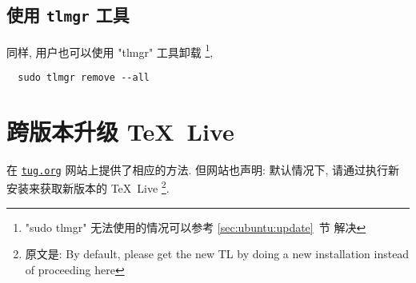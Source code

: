 \subsection{使用 \texttt{tlmgr} 工具}

同样,
用户也可以使用 "tlmgr" 工具卸载%
\footnote{"sudo tlmgr" 无法使用的情况可以参考 \ref{sec:ubuntu:update}~节 解决},
\begin{lstlisting}
  sudo tlmgr remove --all
\end{lstlisting}

\section{跨版本升级 \TeX~Live}\label{sec:ubuntu:version}

在 \href{https://www.tug.org/texlive/upgrade.html}{\texttt{tug.org}}
网站上提供了相应的方法.
但网站也声明:
默认情况下,
请通过执行新安装来获取新版本的 \TeX~Live%
\footnote{原文是: By default,
please get the new TL by doing a new installation instead of proceeding here}.
